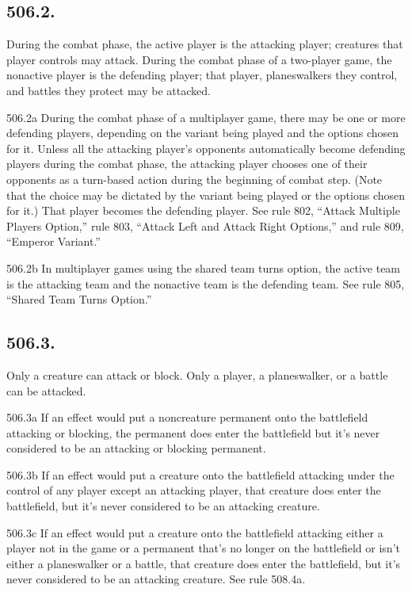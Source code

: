 \subsection*{506.2.}
During the combat phase, the active player is the attacking player; creatures that player controls may attack. During the combat phase of a two-player game, the nonactive player is the defending player; that player, planeswalkers they control, and battles they protect may be attacked.

506.2a During the combat phase of a multiplayer game, there may be one or more defending players, depending on the variant being played and the options chosen for it. Unless all the attacking player’s opponents automatically become defending players during the combat phase, the attacking player chooses one of their opponents as a turn-based action during the beginning of combat step. (Note that the choice may be dictated by the variant being played or the options chosen for it.) That player becomes the defending player. See rule 802, “Attack Multiple Players Option,” rule 803, “Attack Left and Attack Right Options,” and rule 809, “Emperor Variant.”

506.2b In multiplayer games using the shared team turns option, the active team is the attacking team and the nonactive team is the defending team. See rule 805, “Shared Team Turns Option.”

\subsection*{506.3.}
Only a creature can attack or block. Only a player, a planeswalker, or a battle can be attacked.

506.3a If an effect would put a noncreature permanent onto the battlefield attacking or blocking, the permanent does enter the battlefield but it’s never considered to be an attacking or blocking permanent.

506.3b If an effect would put a creature onto the battlefield attacking under the control of any player except an attacking player, that creature does enter the battlefield, but it’s never considered to be an attacking creature.

506.3c If an effect would put a creature onto the battlefield attacking either a player not in the game or a permanent that’s no longer on the battlefield or isn’t either a planeswalker or a battle, that creature does enter the battlefield, but it’s never considered to be an attacking creature. See rule 508.4a.

